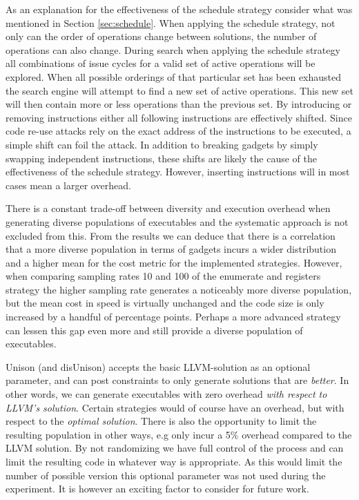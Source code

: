 As an explanation for the effectiveness of the schedule strategy consider what was
mentioned in Section \ref{sec:schedule}. When applying the schedule strategy, not only can
the order of operations change between solutions, the number of operations can also change.
During search when applying the schedule strategy all combinations of issue cycles for a
valid set of active operations will be explored. When all possible orderings of that
particular set has been exhausted the search engine will attempt to find a new set of
active operations. This new set will then contain more or less operations than
the previous set. By introducing or removing instructions either all following instructions
are effectively shifted. Since code re-use attacks rely on the exact address of the
instructions to be executed, a simple shift can foil the attack. In addition to breaking
gadgets by simply swapping independent instructions, these shifts are likely the cause of
the effectiveness of the schedule strategy. However, inserting instructions will in most
cases mean a larger overhead.

There is a constant trade-off between diversity and execution overhead when generating
diverse populations of executables and the systematic approach is not excluded from this.
From the results we can deduce that there is a correlation that a more diverse population
in terms of gadgets incurs a wider distribution and a higher mean for the cost metric for
the implemented strategies. However, when comparing sampling rates 10 and 100 of the
enumerate and registers strategy the higher sampling rate generates a noticeably more
diverse population, but the mean cost in speed is virtually unchanged and the code size is
only increased by a handful of percentage points. Perhaps a more advanced strategy can
lessen this gap even more and still provide a diverse population of executables.

Unison (and disUnison) accepts the basic LLVM-solution as an optional parameter, and can
post constraints to only generate solutions that are \textit{better}. In other words, we
can generate executables with zero overhead \textit{with respect to LLVM's solution}.
Certain strategies would of course have an overhead, but with respect to the
\textit{optimal solution}. There is also the opportunity to limit the resulting population
in other ways, e.g only incur a 5\% overhead compared to the LLVM solution. By not
randomizing we have full control of the process and can limit the resulting code in
whatever way is appropriate. As this would limit the number of possible version this
optional parameter was not used during the experiment. It is however an exciting factor
to consider for future work.

